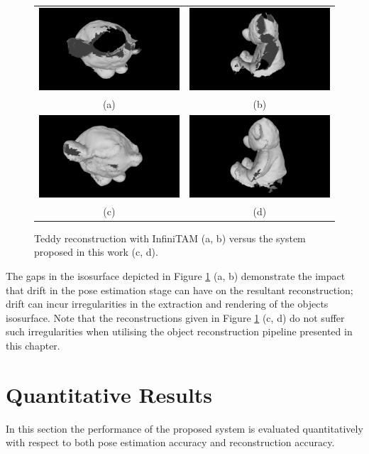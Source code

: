 \begin{figure}[h]
  \label{fig:probobj_gappy_teddy}
	\centering
	\begin{tabular}{cc}
		\includegraphics[width=.2\linewidth]{figures/object_recon/gappy/one_scene00.png}&
    \includegraphics[width=.2\linewidth]{figures/object_recon/gappy/one_scene01.png}\\
    (a) & (b) \\
		\includegraphics[width=.2\linewidth]{figures/object_recon/gappy/multi_scene00.png}&
    \includegraphics[width=.2\linewidth]{figures/object_recon/gappy/multi_scene01.png}\\
    (c) & (d)\\
	\end{tabular}
  \caption[Probabilistic Object Reconstruction Qualitative Results V]
  {
    Teddy reconstruction with InfiniTAM (a, b) versus the system proposed in this 
    work (c, d).
	}
\end{figure}

The gaps in the isosurface depicted in Figure \ref{fig:probobj_gappy_teddy} (a, b) 
demonstrate the impact that drift in the pose estimation stage can have on the resultant 
reconstruction; drift can incur irregularities in the extraction and rendering of the objects 
isosurface. Note that the reconstructions given in Figure \ref{fig:probobj_gappy_teddy} 
(c, d) do not suffer such irregularities when utilising the object reconstruction pipeline 
presented in this chapter.

\section{Quantitative Results}
\label{sec:probobj_quantitative}
In this section the performance of the proposed system is evaluated quantitatively with respect 
to both pose estimation accuracy and reconstruction accuracy. 

